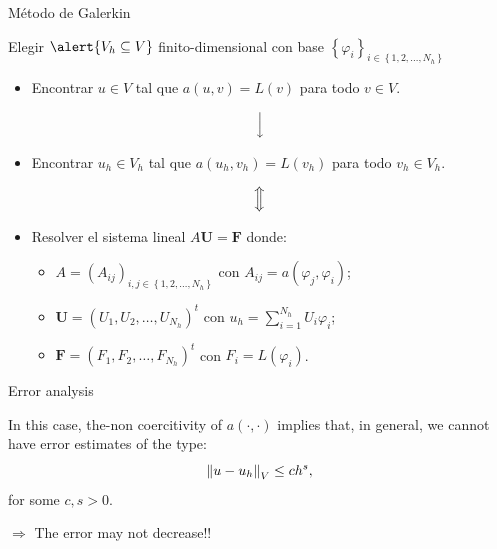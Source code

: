 \begin{frame}{Método de Galerkin}
	\begin{block}{}
	\begin{center}
	Elegir $\alert{V_h\subseteq V}$ finito-dimensional con base $\left\{\varphi_i\right\}_{i\in\left\{1,2,\ldots,N_h \right\}}$
	\end{center}
	\end{block}
	
	\vspace*{-0.3cm}
	\begin{itemize}
	\item Encontrar $u\in V$ tal que $a(u,v)=L(v)$ para todo $v\in V$.
	\end{itemize}
	\vspace*{0.1cm}
	$$\Big{\downarrow}$$
	\vspace*{-0.3cm}
	\begin{itemize}
	\item Encontrar $u_h\in V_h$ tal que $a(u_h,v_h)=L(v_h)$ para todo $v_h\in V_h$.
	\end{itemize}
	\vspace*{0.1cm}
	$$\Big{\Updownarrow}$$
	\vspace*{-0.3cm}
	\begin{itemize}
	\item Resolver el sistema lineal $A\mathbf{U}=\mathbf{F}$ donde:
	\vspace*{0.3cm}
	\begin{itemize}
		\item $A=\left(A_{i j}\right)_{i, j\in\left\{1,2,\ldots,N_h\right\}}$ con $A_{i j}=a(\varphi_j,\varphi_i)$;
		\item $\mathbf{U}=\left(U_1,U_2,\ldots,U_{N_h}\right)^t$ con $u_h=\displaystyle\sum_{i=1}^{N_h}U_i\varphi_i$;
		\item $\mathbf{F}=\left(F_1,F_2,\ldots,F_{N_h}\right)^t$ con $F_i=L\left(\varphi_i\right)$.
	\end{itemize}
	\end{itemize}
\end{frame}

\begin{frame}{Error analysis}
	\begin{block}{}
		In this case, the-non coercitivity of $a(\cdot,\cdot)$ implies that, in general, we cannot have error estimates of the type:
		$$
		\left\|u-u_h\right\|_V\le c h^s,
		$$
		for some $c,s>0$.

		\vspace*{1cm}
		$\Longrightarrow$ \alert{The error may not decrease!!}
	\end{block}
\end{frame}

